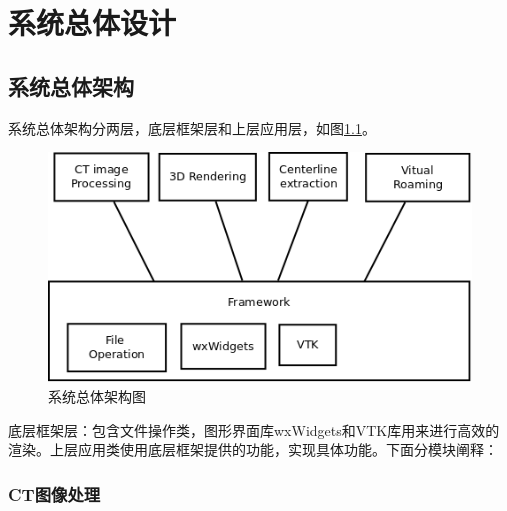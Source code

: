 \chapter{系统总体设计}
\label{chapter-general_design}

\section{系统总体架构}
系统总体架构分两层，底层框架层和上层应用层，如图\ref{structure}。
\begin{figure}[h!]
    \centering
    \includegraphics[width=350bp]{figure/structure.png}
    \caption{系统总体架构图}
    \label{structure}
\end{figure}

底层框架层：包含文件操作类，图形界面库wxWidgets和VTK库用来进行高效的渲染。上层应用类使用底层框架提供的功能，实现具体功能。下面分模块阐释：
\subsection{CT图像处理}

